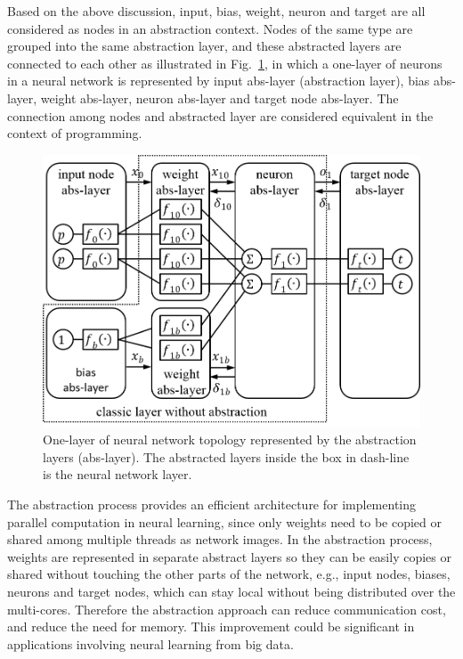 \documentclass[procedia]{easychair}
\begin{document}
Based on the above discussion, input, bias, weight, neuron and target are all considered as nodes in an abstraction context.  Nodes of the same type are grouped into the same abstraction layer, and these abstracted layers are connected to each other as illustrated in Fig.~\ref{fig:nn_abstracted}, in which a one-layer of neurons in a neural network is represented by input abs-layer (abstraction layer), bias abs-layer, weight abs-layer, neuron abs-layer and target node abs-layer.  The connection among nodes and abstracted layer are considered equivalent in the context of programming.

\begin{figure}[tb]
    \begin{centering}
        \includegraphics[scale=0.5]{../pic/nn_abstracted.png}
        \caption{One-layer of neural network topology represented by the abstraction layers (abs-layer).  The abstracted layers inside the box in dash-line is the neural network layer.}
        \label{fig:nn_abstracted}
	\end{centering}
\end{figure}

The abstraction process provides an efficient architecture for implementing parallel computation in neural learning, since only weights need to be copied or shared among multiple threads as network images.  In the abstraction process, weights are represented in separate abstract layers so they can be easily copies or shared without touching the other parts of the network, e.g., input nodes, biases, neurons and target nodes, which can stay local without being distributed over the multi-cores.  Therefore the abstraction approach can reduce communication cost, and reduce the need for memory.  This improvement could be significant in applications involving neural learning from big data.
\end{document}
